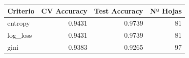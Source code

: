 \begin{tabular}{lrrr}
\toprule
Criterio & CV Accuracy & Test Accuracy & Nº Hojas \\
\midrule
entropy & 0.9431 & 0.9739 & 81 \\
log\_loss & 0.9431 & 0.9739 & 81 \\
gini & 0.9383 & 0.9265 & 97 \\
\bottomrule
\end{tabular}
